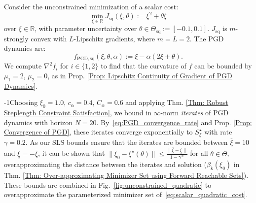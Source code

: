 \documentclass[letterpaper, 10 pt, conference]{ieeeconf}
\newcommand{\R}{\mathbb{R}}
\newcommand{\?}{\stackrel{?}{=}}
\newcommand{\objSq}{J_{\mathrm{sq}}}
\newcommand{\param}{\theta}
\newcommand{\paramSet}{\Theta}
\newcommand{\paramSetSq}{\Theta_{\mathrm{sq}}}
\newcommand{\var}{\xi}
\newcommand{\varOpt}{\var^\star}
\newcommand{\varOptSet}{S_\var^\star}
\newcommand{\convergenceRadius}{\beta}
\newcommand{\ratePGD}{\alpha}
\newcommand{\ratePGDMin}{c_\ratePGD}
\newcommand{\ratePGDMax}{C_\ratePGD}
\newcommand{\convergenceRatePGD}{\gamma}
\newcommand{\dynamicsPGDSq}{f_{\mathrm{PGD, sq}}}
\newcommand{\constraintSet}{{S_{\mathcal{C}}}}
\newcommand{\iterationHorizon}{N}
\newcommand{\dynamicsFullState}{f}
\newcommand{\hessianBound}{\mu}
\newcommand{\brendan}[1]{{\textcolor[rgb]{1,0,1}{\textsf{[Brendan: {#1}]}}}}
\begin{document}

Consider the unconstrained minimization of a scalar cost:
{
\setlength{\abovedisplayskip}{3.5pt}
\setlength{\belowdisplayskip}{3.5pt}
\begin{equation}
    \label{eq:scalar_quadratic_cost}
    \min_{\var \in \R} \objSq(\var, \param) := \var^2 + \param \var
\end{equation}
}
\hspace{-1.5mm}over $\var \in \R$,
with parameter uncertainty over $\param \in \paramSetSq := [-0.1, 0.1]$.
$\objSq$ is $m$-strongly convex with $L$-Lipschitz gradients, where
$m = L = 2$.
The PGD dynamics are:
\begin{equation}
    \label{eq:scalar_quadratic_pgd}
    \dynamicsPGDSq(\var, \param, \ratePGD) := \var - \ratePGD (2 \var + \param).
\end{equation}
We 
compute $\nabla^2 \dynamicsFullState_i$ for $i \in \{1, 2\}$ to find that the curvature of $\dynamicsFullState$ can be bounded by $\hessianBound_1=2$, $\hessianBound_2=0$, as in Prop. \ref{Prop: Lipschitz Continuity of Gradient of PGD Dynamics}.

\looseness-1Choosing $\var_0 = 1.0$, $\ratePGDMin=0.4$, $\ratePGDMax=0.6$ and applying Thm. \ref{Thm: Robust Steplength Constraint Satisfaction}, we bound in 
$\infty$-norm
\emph{iterates} of PGD dynamics with horizon $\iterationHorizon=20$. 
By~\eqref{eq:PGD_convergence_rate} and Prop. \ref{Prop: Convergence of PGD}, these iterates converge exponentially to $\varOptSet$ with rate $\convergenceRatePGD = 0.2$.
As our SLS bounds ensure that the iterates are bounded between $\overline{\var} = 10$ and $\underline{\var} = - \overline{\var}$, it can be shown that $\lVert \var_0 - \varOpt(\param) \rVert \le \frac{\lVert \overline{\var} - \underline{\var} \rVert}{1 - \convergenceRatePGD^\iterationHorizon}$ for all $\param \in \paramSet$, overapproximating the distance between the iterates and solution ($\convergenceRadius_k(\var_0)$ in Thm. \ref{Thm: Over-approximating Minimizer Set using Forward Reachable Sets}).
These bounds are combined in Fig.~\ref{fig:unconstrained_quadratic} to overapproximate the parameterized minimizer set of~\eqref{eq:scalar_quadratic_cost}.
\end{document}
